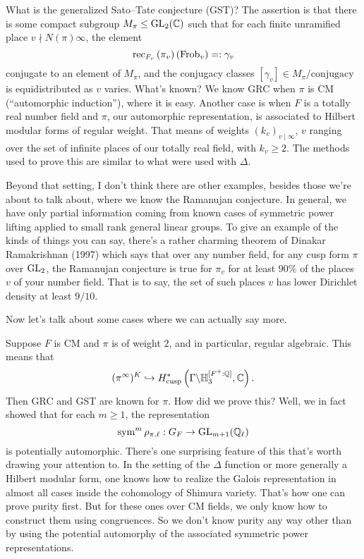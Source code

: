 \documentclass[reqno]{amsart} 
\begin{document}
What is the generalized Sato--Tate conjecture (GST)?  The assertion is that there is some compact subgroup $M_\pi \leq \operatorname{GL}_2(\mathbb{C})$ such that for each finite unramified place $v \nmid N(\pi) \infty$, the element
\begin{equation*}
  \operatorname{rec}_{F_v} \left( \pi_v \right)(\operatorname{Frob}_v) =: \gamma_v
\end{equation*}
conjugate to an element of $M_\pi$, and the conjugacy classes $[\gamma_v] \in M_\pi / \mathrm{conjugacy}$ is equidistributed as $v$ varies.  What's known?  We know GRC when $\pi$ is CM (``automorphic induction''), where it is easy.  Another case is when $F$ is a totally real number field and $\pi$, our automorphic representation, is associated to Hilbert modular forms of regular weight.  That means of weights $(k_v)_{v \mid \infty}$, $v$ ranging over the set of infinite places of our totally real field, with $k_v \geq 2$.  The methods used to prove this are similar to what were used with $\Delta$.

Beyond that setting, I don't think there are other examples, besides those we're about to talk about, where we know the Ramanujan conjecture.  In general, we have only partial information coming from known cases of symmetric power lifting applied to small rank general linear groups.  To give an example of the kinds of things you can say, there's a rather charming theorem of Dinakar Ramakrishnan (1997) which says that over any number field, for any cusp form $\pi$ over $\operatorname{GL}_2$, the Ramanujan conjecture is true for $\pi _v$ for at least $90\%$ of the places $v$ of your number field.  That is to say, the set of such places $v$ has lower Dirichlet density at least $9/10$.

Now let's talk about some cases where we can actually say more.


Suppose $F$ is CM and $\pi$ is of weight $2$, and in particular, regular algebraic.  This means that
\begin{equation*}
  (\pi^\infty)^K \hookrightarrow H^\ast_{\operatorname{cusp}} \left( \Gamma \backslash \mathbb{H}_3^{[F^+ : \mathbb{Q}]}, \mathbb{C} \right).
\end{equation*}
Then GRC and GST are known for $\pi$.  How did we prove this?  Well, we in fact showed that for each $m \geq 1$, the representation
\begin{equation*}
  \operatorname{sym}^m \rho_{\pi, \ell} : G_F \rightarrow \operatorname{GL}_{m + 1}(\mathbb{Q}_{\ell})
\end{equation*}
is potentially automorphic.  There's one surprising feature of this that's worth drawing your attention to.  In the setting of the $\Delta$ function or more generally a Hilbert modular form, one knows how to realize the Galois representation in almost all cases inside the cohomology of Shimura variety.  That's how one can prove purity first.  But for these ones over CM fields, we only know how to construct them using congruences.  So we don't know purity any way other than by using the potential automorphy of the associated symmetric power representations.
\end{document}
